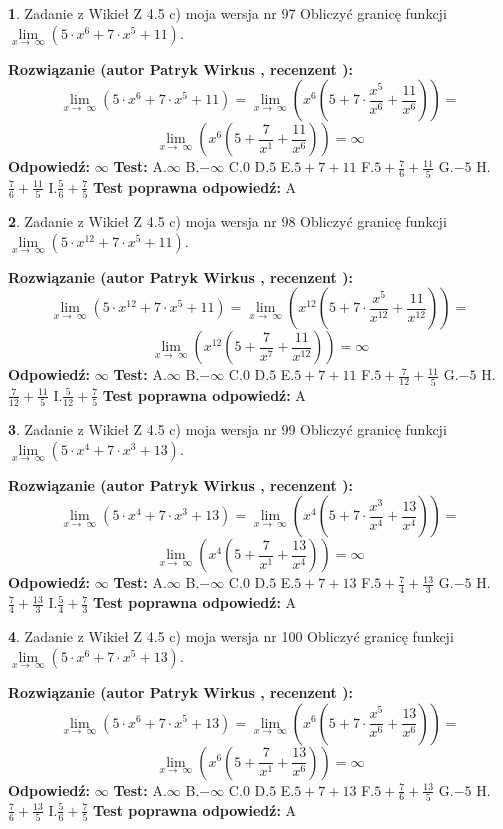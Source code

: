 \documentclass[12pt, a4paper]{article}
\theoremstyle{definition} %
\newtheorem{zad}{}
\newcommand{\zadStart}[1]{\begin{zad}#1\newline}
\newcommand{\zadStop}{\end{zad}}
\newcommand{\rozwStart}[2]{\noindent \textbf{Rozwiązanie (autor #1 , recenzent #2): }\newline}
\newcommand{\rozwStop}{\newline}
\newcommand{\odpStart}{\noindent \textbf{Odpowiedź:}\newline}
\newcommand{\odpStop}{\newline}
\newcommand{\testStart}{\noindent \textbf{Test:}\newline}
\newcommand{\testStop}{\newline}
\newcommand{\kluczStart}{\noindent \textbf{Test poprawna odpowiedź:}\newline}
\newcommand{\kluczStop}{\newline}
\begin{document}
\zadStart{Zadanie z Wikieł Z 4.5 c) moja wersja nr 97}
Obliczyć granicę funkcji  $\lim\limits_{x\to\ \infty}(5 \cdot x^{6}+7 \cdot x^{5}+11)$.
\zadStop
\rozwStart{Patryk Wirkus}{}
$$\lim\limits_{x\to\ \infty}(5 \cdot x^{6}+7 \cdot x^{5}+11) = \lim\limits_{x\to\ \infty}(x^{6}(5 +7 \cdot \frac{x^{5}}{x^{6}}+\frac{11}{x^{6}})) =$$ $$\lim\limits_{x\to\ \infty}(x^{6}(5 +\frac{7}{x^{1}}+\frac{11}{x^{6}})) =\infty$$
\rozwStop
\odpStart
$\infty$
\odpStop
\testStart
A.$\infty$ B.$-\infty$ C.$0$ D.$5$ E.$5 + 7 + 11$
F.$5+\frac{7}{6}+\frac{11}{5}$ G.$-5$
H.$\frac{7}{6}+\frac{11}{5}$
I.$\frac{5}{6}+\frac{7}{5}$
\testStop
\kluczStart
A
\kluczStop



\zadStart{Zadanie z Wikieł Z 4.5 c) moja wersja nr 98}
Obliczyć granicę funkcji  $\lim\limits_{x\to\ \infty}(5 \cdot x^{12}+7 \cdot x^{5}+11)$.
\zadStop
\rozwStart{Patryk Wirkus}{}
$$\lim\limits_{x\to\ \infty}(5 \cdot x^{12}+7 \cdot x^{5}+11) = \lim\limits_{x\to\ \infty}(x^{12}(5 +7 \cdot \frac{x^{5}}{x^{12}}+\frac{11}{x^{12}})) =$$ $$\lim\limits_{x\to\ \infty}(x^{12}(5 +\frac{7}{x^{7}}+\frac{11}{x^{12}})) =\infty$$
\rozwStop
\odpStart
$\infty$
\odpStop
\testStart
A.$\infty$ B.$-\infty$ C.$0$ D.$5$ E.$5 + 7 + 11$
F.$5+\frac{7}{12}+\frac{11}{5}$ G.$-5$
H.$\frac{7}{12}+\frac{11}{5}$
I.$\frac{5}{12}+\frac{7}{5}$
\testStop
\kluczStart
A
\kluczStop



\zadStart{Zadanie z Wikieł Z 4.5 c) moja wersja nr 99}
Obliczyć granicę funkcji  $\lim\limits_{x\to\ \infty}(5 \cdot x^{4}+7 \cdot x^{3}+13)$.
\zadStop
\rozwStart{Patryk Wirkus}{}
$$\lim\limits_{x\to\ \infty}(5 \cdot x^{4}+7 \cdot x^{3}+13) = \lim\limits_{x\to\ \infty}(x^{4}(5 +7 \cdot \frac{x^{3}}{x^{4}}+\frac{13}{x^{4}})) =$$ $$\lim\limits_{x\to\ \infty}(x^{4}(5 +\frac{7}{x^{1}}+\frac{13}{x^{4}})) =\infty$$
\rozwStop
\odpStart
$\infty$
\odpStop
\testStart
A.$\infty$ B.$-\infty$ C.$0$ D.$5$ E.$5 + 7 + 13$
F.$5+\frac{7}{4}+\frac{13}{3}$ G.$-5$
H.$\frac{7}{4}+\frac{13}{3}$
I.$\frac{5}{4}+\frac{7}{3}$
\testStop
\kluczStart
A
\kluczStop



\zadStart{Zadanie z Wikieł Z 4.5 c) moja wersja nr 100}
Obliczyć granicę funkcji  $\lim\limits_{x\to\ \infty}(5 \cdot x^{6}+7 \cdot x^{5}+13)$.
\zadStop
\rozwStart{Patryk Wirkus}{}
$$\lim\limits_{x\to\ \infty}(5 \cdot x^{6}+7 \cdot x^{5}+13) = \lim\limits_{x\to\ \infty}(x^{6}(5 +7 \cdot \frac{x^{5}}{x^{6}}+\frac{13}{x^{6}})) =$$ $$\lim\limits_{x\to\ \infty}(x^{6}(5 +\frac{7}{x^{1}}+\frac{13}{x^{6}})) =\infty$$
\rozwStop
\odpStart
$\infty$
\odpStop
\testStart
A.$\infty$ B.$-\infty$ C.$0$ D.$5$ E.$5 + 7 + 13$
F.$5+\frac{7}{6}+\frac{13}{5}$ G.$-5$
H.$\frac{7}{6}+\frac{13}{5}$
I.$\frac{5}{6}+\frac{7}{5}$
\testStop
\kluczStart
A
\kluczStop
\end{document}
